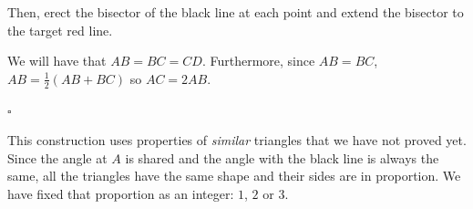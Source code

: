 \documentclass[11pt, oneside]{article}
\begin{document}
Then, erect the bisector of the black line at each point and extend the bisector to the target red line.

We will have that $AB = BC = CD$.  Furthermore, since $AB = BC$, $AB = \frac{1}{2} (AB + BC)$ so $AC = 2 AB$.

$\square$

This construction uses properties of \emph{similar} triangles that we have not proved yet.  Since the angle at $A$ is shared and the angle with the black line is always the same, all the triangles have the same shape and their sides are in proportion.  We have fixed that proportion as an integer:  $1$, $2$ or $3$.
\end{document}
